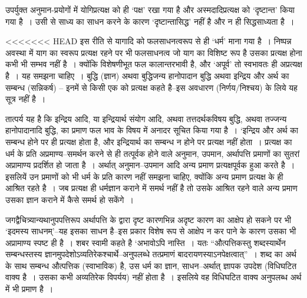 उपर्युक्त अनुमान-प्रयोगों में योगिप्रत्यक्ष को ही ‘पक्ष' रखा गया है और अस्मदादिप्रत्यक्ष को ‘दृष्टान्त' किया गया है~। उसी से साध्य का साधन करने के कारण ‘दृष्टान्तासिद्ध' नहीं है और न ही सिद्धसाध्यता है~।

<<<<<<< HEAD
इस रीति से यागादि को फलसाधनत्वरूप से ही ‘धर्म' माना गया है~। निष्पन्न अवस्था में याग का स्वरूप प्रत्यक्ष रहने पर भी फलसाधनत्व जो याग का विशिष्ट रूप है उसका प्रत्यक्ष होना कभी भी सम्भव नहीं है~। क्योंकि विशेषणीभूत फल कालान्तरभावी है, और ‘अपूर्व' तो स्वभावतः ही अप्रत्यक्ष है~। यह समझना चाहिए~। बुद्धि (ज्ञान) अथवा बुद्धिजन्य हानोपादान बुद्धि अथवा इन्द्रिय और अर्थ का सम्बन्ध (सन्निकर्ष) – इनमें से किसी एक को प्रत्यक्ष कहते है–इस अवधारण (निर्णय/निश्चय) के लिये यह सूत्र नहीं है~। 

तात्पर्य यह है कि इन्द्रिय आदि, या इन्द्रियार्थ संयोग आदि, अथवा तत्तदर्थकविषय बुद्धि, अथवा तज्जन्य हानोपादानादि बुद्धि, का प्रमाण फल भाव के विषय में अनादर सूचित किया गया है~। ‘इन्द्रिय और अर्थ का सम्बन्ध होने पर ही प्रत्यक्ष होता है, और इन्द्रियार्थ का सम्बन्ध न होने पर प्रत्यक्ष नहीं होता~। प्रत्यक्ष का धर्म के प्रति अप्रमाण्य–समर्थन करने से ही तत्पूर्वक होने वाले अनुमान, उपमान, अर्थापत्ति प्रमाणों का सुतरां अप्रामाण्य प्रदर्शित हो जाता है~। अर्थात् अनुमान–उपमान आदि अन्य प्रमाण प्रत्यक्षपूर्वक हुआ करते है~। इसलियें उन प्रमाणों को भी धर्म के प्रति कारण नहीं समझना चाहिए, क्योंकि अन्य प्रमाण प्रत्यक्ष के ही आश्रित रहते है~। जब प्रत्यक्ष ही धर्मज्ञान कराने में समर्थ नहीं है तो उसके आश्रित रहने वाले अन्य प्रमाण उसका ज्ञान कराने में कैसे समर्थ हो सकेंगे~। 

जगद्वैचित्र्यान्यथानुपपत्तिरूप अर्थापत्ति के द्वारा दृष्ट कारणभिन्न अदृष्ट कारण का आक्षेप हो सकने पर भी ‘इदमस्य साधनम्'–यह इसका साधन है–इस प्रकार विशेष रूप से आक्षेप न कर पाने के कारण उसका भी अप्रामाण्य स्पष्ट ही है~। शबर स्वामी कहते है ‘अभावोऽपि नास्ति~। यतः “औत्पत्तिकस्तु शब्दस्यार्थेन सम्बन्धस्तस्य ज्ञानमुपदेशोऽव्यतिरेकश्चार्थे–अनुपलब्धे तत्प्रमाणं बादरायणस्याऽनपेक्षत्वात्”~। शब्द का अर्थ के साथ सम्बन्ध औत्पत्तिक (स्वाभाविक) है, उस धर्म का ज्ञान, साधन–अर्थात् ज्ञापक उपदेश (विधिघटित वाक्य है~। उसका कभी अव्यतिरेक विपर्यय) नहीं होता है~। इसलिये वह विधिघटित वाक्य अनुपलब्ध अर्थ में भी प्रमाण है~।

